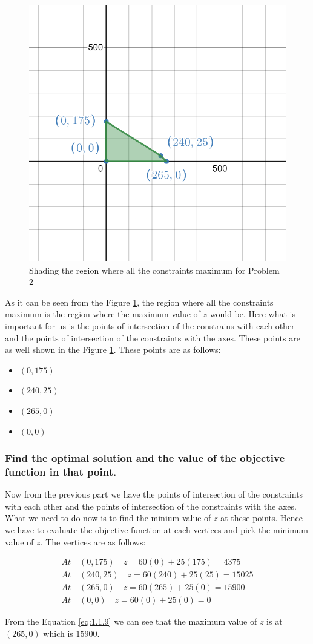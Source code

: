 \documentclass[unicode,11pt,a4paper,oneside,numbers=endperiod,openany]{scrartcl}
\begin{document}
\begin{figure}[H]
	\centering
	\includegraphics[width=0.5\linewidth]{figures/problem_1.2.2.png}
	\caption{Shading the region where all the constraints maximum for Problem 2}
	\label{fig:problem_2.2}
\end{figure}

As it can be seen from the Figure \ref{fig:problem_2.2}, the region where all the constraints maximum is the region where the maximum value of $z$ would be. Here what is important for us is the points of intersection of the constrains with each other and the points of intersection of the constraints with the axes. These points are as well shown in the Figure \ref{fig:problem_2.2}. These points are as follows:

\begin{itemize}
	\item $(0, 175)$
	\item $(240, 25)$
	\item $(265, 0)$
	\item $(0, 0)$
\end{itemize}

\subsubsection{ Find the optimal solution and the value of the objective function in that point.}

Now from the previous part we have the points of intersection of the constraints with each other and the points of intersection of the constraints with the axes. What we need to do now is to find the minium value of $z$ at these points. Hence we have to evaluate the objective function at each vertices and pick the minimum value of $z$. The vertices are as follows:

\begin{equation}
	\begin{aligned}
		At \quad (0, 175) \quad z = 60(0) + 25(175) = 4375    \\
		At \quad (240, 25) \quad z = 60(240) + 25(25) = 15025 \\
		At \quad (265, 0) \quad z = 60(265) + 25(0) = 15900   \\
		At \quad (0, 0) \quad z = 60(0) + 25(0) = 0
	\end{aligned}
	\label{eq:1.1.9}
\end{equation}

From the Equation \ref{eq:1.1.9} we can see that the maximum value of $z$ is at $(265, 0)$ which is $15900$.
\end{document}
